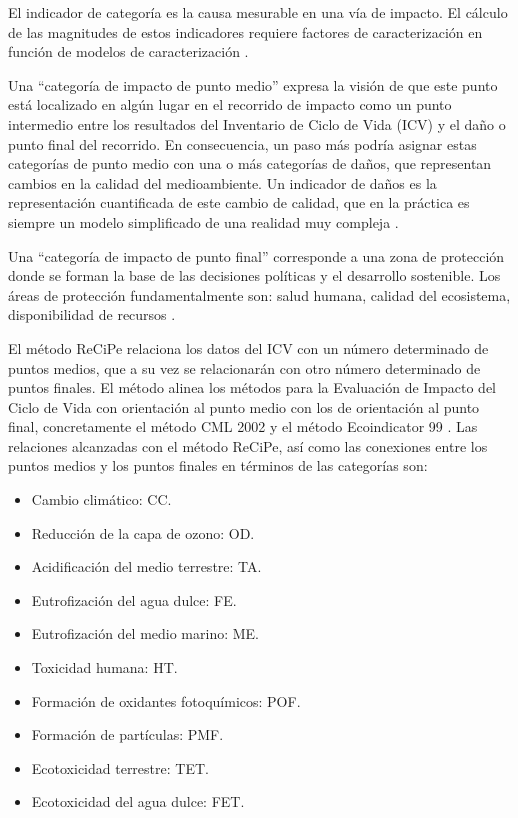 El indicador de categoría es la causa mesurable en una vía de impacto. El cálculo de las magnitudes de estos indicadores requiere factores de caracterización en función de modelos de caracterización \cite{mlgceballos}.

Una ``categoría de impacto de punto medio'' expresa la visión de que este punto está localizado en algún lugar en el recorrido de impacto como un punto intermedio entre los resultados del Inventario de Ciclo de Vida (ICV) y el daño o punto final del recorrido. En consecuencia, un paso más podría asignar estas categorías de punto medio con una o más categorías de daños, que representan cambios en la calidad del medioambiente. Un indicador de daños es la representación cuantificada de este cambio de calidad, que en la práctica es siempre un modelo simplificado de una realidad muy compleja \cite{ecoinventlcia}.

Una ``categoría de impacto de punto final'' corresponde a una zona de protección donde se forman la base de las decisiones políticas y el desarrollo sostenible. Los áreas de protección fundamentalmente son: salud humana, calidad del ecosistema, disponibilidad de recursos \cite{mlgceballos}.

El método ReCiPe relaciona los datos del ICV con un número determinado de puntos medios, que a su vez se relacionarán con otro número determinado de puntos finales. El método alinea los métodos para la Evaluación de Impacto del Ciclo de Vida con orientación al punto medio con los de orientación al punto final, concretamente el método CML 2002 y el método Ecoindicator 99 \cite{unijaume}. Las relaciones alcanzadas con el método ReCiPe, así como las conexiones entre los puntos medios y los puntos finales en términos de las categorías son:
\begin{itemize}
  \item Cambio climático: CC.
  \item Reducción de la capa de ozono: OD.
  \item Acidificación del medio terrestre: TA.
  \item Eutrofización del agua dulce: FE.
  \item Eutrofización del medio marino: ME.
  \item Toxicidad humana: HT.
  \item Formación de oxidantes fotoquímicos: POF.
  \item Formación de partículas: PMF.
  \item Ecotoxicidad terrestre: TET.
  \item Ecotoxicidad del agua dulce: FET.
\end{itemize}

